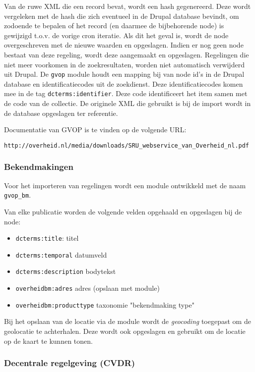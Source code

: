 Van de ruwe XML die een record bevat, wordt een hash gegenereerd. Deze wordt vergeleken met de hash die zich eventueel in de Drupal database bevindt, om zodoende te bepalen of het record (en daarmee de bijbehorende node) is gewijzigd t.o.v. de vorige cron iteratie. Als dit het geval is, wordt de node overgeschreven met de nieuwe waarden en opgeslagen. Indien er nog geen node bestaat van deze regeling, wordt deze aangemaakt en opgeslagen. Regelingen die niet meer voorkomen in de zoekresultaten, worden niet automatisch verwijderd uit Drupal.
De \texttt{gvop} module houdt een mapping bij van node id's in de Drupal database en identificatiecodes uit de zoekdienst. Deze identificatiecodes komen mee in de tag \texttt{dcterms:identifier}. Deze code identificeert het item samen met de code van de collectie.
De originele XML die gebruikt is bij de import wordt in de database opgeslagen ter referentie.

Documentatie van GVOP is te vinden op de volgende URL:
\begin{verbatim}
http://overheid.nl/media/downloads/SRU_webservice_van_Overheid_nl.pdf
\end{verbatim}

\subsubsection{Bekendmakingen}

Voor het importeren van regelingen wordt een module ontwikkeld met de naam \texttt{gvop\_bm}.

Van elke publicatie worden de volgende velden opgehaald en opgeslagen bij de node:

\begin{itemize}
\item \texttt{dcterms:title}: titel
\item \texttt{dcterms:temporal} datumveld
\item \texttt{dcterms:description} bodytekst
\item \texttt{overheidbm:adres} adres (opslaan met  module)
\item \texttt{overheidbm:producttype} taxonomie "bekendmaking type"
\end{itemize}

Bij het opslaan van de locatie via de  module wordt de \emph{geocoding} toegepast om de geolocatie te achterhalen. Deze wordt ook opgeslagen en gebruikt om de locatie op de kaart te kunnen tonen.

\subsubsection{Decentrale regelgeving (CVDR)}

